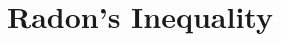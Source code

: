 \documentclass[inequalities.tex]{subfile}
\begin{document}
	\section{Radon's Inequality}\label{sec:radon}
	\textcite{johann_radon_1913}
\end{document}
